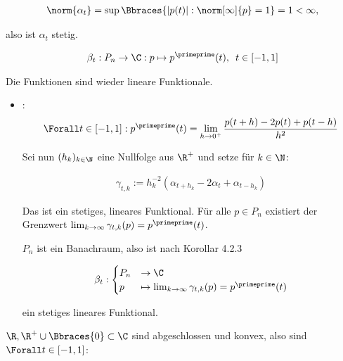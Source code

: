 \begin{solution}
\begin{itemize}
  \begin{align*}
    \norm{\alpha_t}
    =
    \sup \Bbraces
    {
      |p(t)|:
      \norm[\infty]{p} = 1
    }
    = 1 < \infty,
  \end{align*}

  also ist $\alpha_t$ stetig.

\end{itemize}

\begin{align*}
  \beta_t :
  P_n \to \C:
  p \mapsto p^\primeprime(t),
  \enspace
  t \in [-1, 1]
\end{align*}

Die Funktionen sind wieder lineare Funktionale.

\begin{itemize}

  \item
  : \\

  \begin{align*}
    \Forall t \in [-1, 1]:
    p^\primeprime(t)
    =
    \lim_{h \to 0^+} \frac{p(t+h) - 2 p(t) + p(t-h)}{h^2}
  \end{align*}

  Sei nun $(h_k)_{k \in \N}$ eine Nullfolge aus $\R^+$ und setze für $k \in \N$:

  \begin{align*}
    \gamma_{t, k}
    :=
    h_k^{-2}(\alpha_{t + h_k} - 2 \alpha_t + \alpha_{t - h_k})
  \end{align*}

  Das ist ein stetiges, lineares Funktional.
  Für alle $p \in P_n$ existiert der Grenzwert $\lim_{k \to \infty} \gamma_{t, k}(p) = p^\primeprime(t)$.


  $P_n$ ist ein Banachraum, also ist nach Korollar 4.2.3

  \begin{align*}
    \beta_t:
    \begin{cases}
      P_n & \to \C \\
      p   & \mapsto \lim_{k \to \infty} \gamma_{t, k}(p) = p^\primeprime(t)
    \end{cases}
  \end{align*}

  ein stetiges lineares Funktional.

\end{itemize}

$\R, \R^+ \cup \Bbraces{0} \subset \C$ sind abgeschlossen und konvex, also sind $\Forall t \in [-1, 1]$:


\end{solution}
